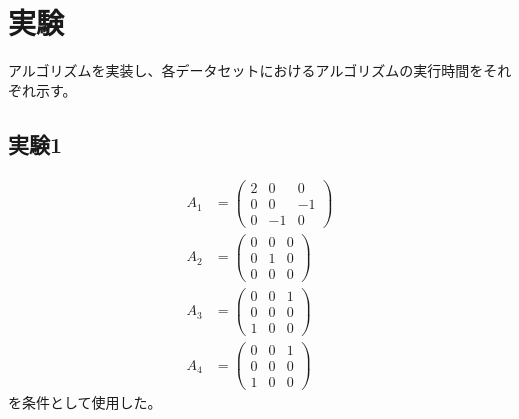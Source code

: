 \section{実験}
アルゴリズムを実装し、各データセットにおけるアルゴリズムの実行時間をそれぞれ示す。

\subsection{実験1}
\begin{align*}
  A_1 & = \left(
            \begin{array}{ccc}
              2 &  0 &  0 \\
              0 &  0 & -1 \\
              0 & -1 &  0
            \end{array}
          \right) \\
  A_2 & = \left(
            \begin{array}{ccc}
              0 & 0 & 0 \\
              0 & 1 & 0 \\
              0 & 0 & 0
            \end{array}
          \right) \\
  A_3 & = \left(
            \begin{array}{ccc}
              0 & 0 & 1 \\
              0 & 0 & 0 \\
              1 & 0 & 0
            \end{array}
          \right) \\
  A_4 & = \left(
            \begin{array}{ccc}
              0 & 0 & 1 \\
              0 & 0 & 0 \\
              1 & 0 & 0
            \end{array}
          \right)
\end{align*}
を条件として使用した。

